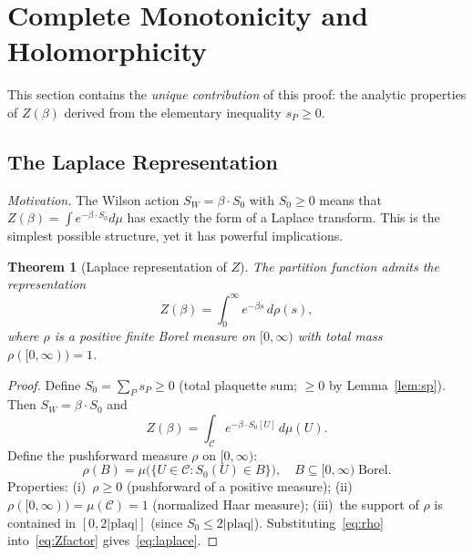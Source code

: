 \documentclass[12pt,a4paper]{article}
\theoremstyle{plain}
\newtheorem{theorem}{Theorem}[section]
\theoremstyle{definition}
\theoremstyle{remark}
\begin{document}

\section{Complete Monotonicity and Holomorphicity}\label{sec:analytic}

This section contains the \emph{unique contribution} of this proof: the analytic properties of $Z(\beta)$ derived from the elementary inequality $s_P\geq 0$.

\subsection{The Laplace Representation}\label{sec:laplace}

\textit{Motivation.} The Wilson action $S_W=\beta\cdot S_0$ with $S_0\geq 0$ means that $Z(\beta)=\int e^{-\beta\cdot S_0}d\mu$ has exactly the form of a Laplace transform. This is the simplest possible structure, yet it has powerful implications.

\begin{theorem}[Laplace representation of $Z$]\label{thm:laplace}
The partition function admits the representation
\begin{equation}\label{eq:laplace}
Z(\beta) = \int_0^\infty e^{-\beta s}\,d\rho(s),
\end{equation}
where $\rho$ is a positive finite Borel measure on $[0,\infty)$ with total mass $\rho([0,\infty))=1$.
\end{theorem}

\begin{proof}
Define $S_0=\sum_P s_P\geq 0$ (total plaquette sum; $\geq 0$ by Lemma~\ref{lem:sp}). Then $S_W=\beta\cdot S_0$ and
\begin{equation}\label{eq:Zfactor}
Z(\beta) = \int_{\mathcal{C}} e^{-\beta\cdot S_0[U]}\,d\mu(U).
\end{equation}
Define the pushforward measure $\rho$ on $[0,\infty)$:
\begin{equation}\label{eq:rho}
\rho(B) = \mu\bigl(\{U\in\mathcal{C}: S_0(U)\in B\}\bigr), \quad B\subseteq[0,\infty)\;\text{Borel}.
\end{equation}
Properties: (i)~$\rho\geq 0$ (pushforward of a positive measure); (ii)~$\rho([0,\infty))=\mu(\mathcal{C})=1$ (normalized Haar measure); (iii)~the support of $\rho$ is contained in $[0,2|\mathrm{plaq}|]$ (since $S_0\leq 2|\mathrm{plaq}|$). Substituting~\eqref{eq:rho} into~\eqref{eq:Zfactor} gives~\eqref{eq:laplace}.
\end{proof}
\end{document}
